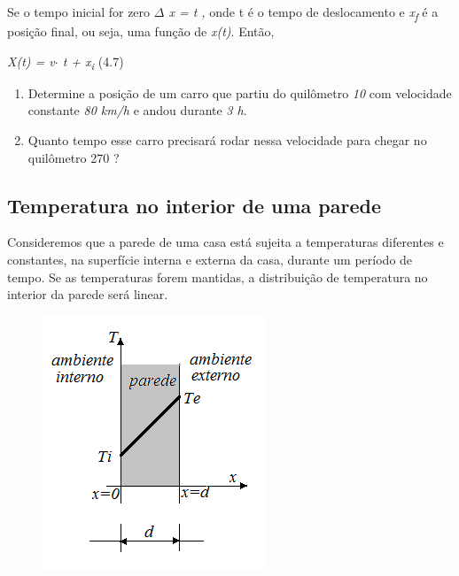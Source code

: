 Se o tempo inicial for zero  \textit{$ \Delta $ x = t , }onde t é o tempo de deslocamento e \textit{x\textsubscript{f}}   é a posição final, ou seja, uma função de \textit{x(t)}. Então,

\begin{FlushRight}
\textit{X(t) = v$ \cdot $ t + x\textsubscript{i}} \tab (4.7)
\end{FlushRight}

\begin{enumerate}
	\item Determine a posição de um carro que partiu do quilômetro \textit{10} com velocidade constante \textit{80 km/h} e andou durante \textit{3 h}.

	\item Quanto tempo esse carro precisará rodar nessa velocidade para chegar no quilômetro 270 ?
\end{enumerate}

\subsection{Temperatura no interior de uma parede}

Consideremos que a parede de uma casa está sujeita a temperaturas diferentes e constantes, na superfície interna e externa da casa, durante um período de tempo. Se as temperaturas forem mantidas, a distribuição de temperatura no interior da parede será linear. 

\begin{figure}[H]
	\begin{Center}
		\includegraphics[width=2.64in,height=2.98in]{capitulos/funcao_do_primeiro_grau/media/image24.png}
	\end{Center}
\end{figure}

